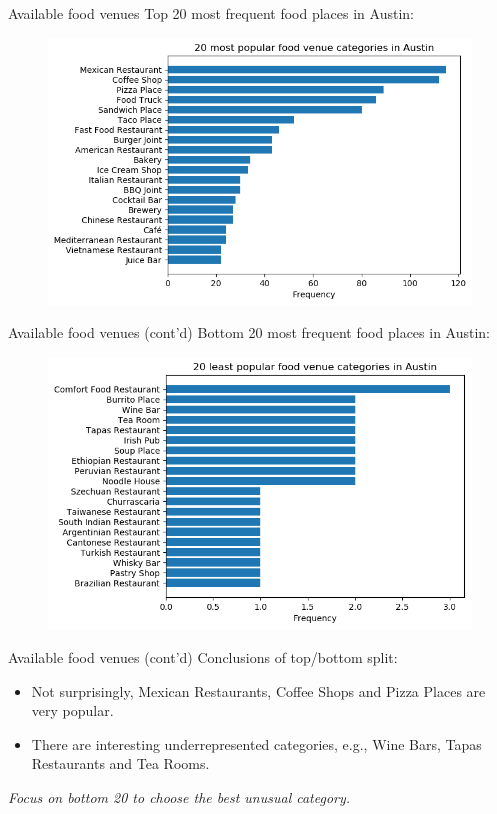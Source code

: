 \documentclass{beamer}
\begin{document}
    \begin{frame}{Available food venues}
Top 20 most frequent food places in Austin:
     \begin{figure}[H]
	\centering
	\includegraphics[width=.9\textwidth]{pics/top_20_venues}
\end{figure}
  \end{frame}
    \begin{frame}{Available food venues (cont'd)}
Bottom 20 most frequent food places in Austin:
     \begin{figure}[H]
	\centering
	\includegraphics[width=.9\textwidth]{pics/bottom_20_venues}
\end{figure}
  \end{frame}
  \begin{frame}{Available food venues (cont'd)}
  Conclusions of top/bottom split:
\begin{itemize}
\item[\EightStarTaper] Not surprisingly, Mexican Restaurants, Coffee Shops and Pizza Places are very popular.
\item[\EightStarTaper] There are interesting underrepresented categories, e.g., Wine Bars, Tapas Restaurants and Tea Rooms.
\end{itemize}
  \begin{center}
 {\it Focus on bottom 20 to choose the best unusual category.}
\end{center}
    \end{frame}
\end{document}
